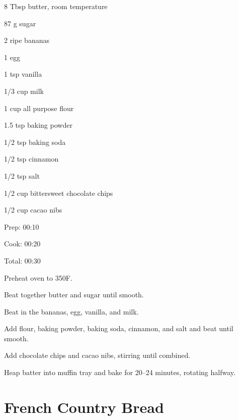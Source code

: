 \documentclass[oneside]{book}  %
\def\thisrecipe{}  %
\newcommand{\recipe}[1]{\section{#1}\def\thisrecipe{: #1}} %
\newcommand{\degF}{\textdegree F\xspace}
\begin{document}
\begin{IT}
  \begin{ingredients}
    \item[8 Tbsp] butter, room temperature
    \item[87 g] sugar
    \item[2] ripe bananas
    \item[1] egg
    \item[1 tsp] vanilla
    \item[1/3 cup] milk
    \item[1 cup] all purpose flour
    \item[1.5 tsp] baking powder
    \item[1/2 tsp] baking soda
    \item[1/2 tsp] cinnamon
    \item[1/2 tsp] salt
    \item[1/2 cup] bittersweet chocolate chips
    \item[1/2 cup] cacao nibs
  \end{ingredients}

  \switchcolumn

  \begin{timeline}
    \item[Prep:]  00:10
    \item[Cook:]  00:20
    \item[Total:] 00:30
  \end{timeline}
\end{IT}

\begin{directions}
  \item Preheat oven to 350\degF.
  \item Beat together butter and sugar until smooth.
  \item Beat in the bananas, egg, vanilla, and milk.
  \item Add flour, baking powder, baking soda, cinnamon, and salt and beat until
    smooth.

  \columnbreak

  \item Add chocolate chips and cacao nibs, stirring until combined.
  \item Heap batter into muffin tray and bake for 20--24 minutes, rotating
    halfway.
\end{directions}
\recipe{French Country Bread} \label{recipe:french_country_bread} %
\end{document}
